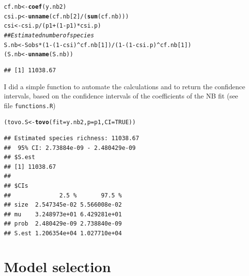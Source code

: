 \documentclass[12pt, A4]{article}\usepackage[]{graphicx}\usepackage[]{color}
\makeatletter
\newcommand{\hlnum}[1]{\textcolor[rgb]{0.686,0.059,0.569}{#1}}%
\newcommand{\hlcom}[1]{\textcolor[rgb]{0.678,0.584,0.686}{\textit{#1}}}%
\newcommand{\hlopt}[1]{\textcolor[rgb]{0,0,0}{#1}}%
\newcommand{\hlstd}[1]{\textcolor[rgb]{0.345,0.345,0.345}{#1}}%
\newcommand{\hlkwb}[1]{\textcolor[rgb]{0.69,0.353,0.396}{#1}}%
\newcommand{\hlkwc}[1]{\textcolor[rgb]{0.333,0.667,0.333}{#1}}%
\newcommand{\hlkwd}[1]{\textcolor[rgb]{0.737,0.353,0.396}{\textbf{#1}}}%
\newenvironment{kframe}{%
 \def\at@end@of@kframe{}%
 \ifinner\ifhmode%
  \def\at@end@of@kframe{\end{minipage}}%
  \begin{minipage}{\columnwidth}%
 \fi\fi%
 \def\FrameCommand##1{\hskip\@totalleftmargin \hskip-\fboxsep
 \colorbox{shadecolor}{##1}\hskip-\fboxsep
     \hskip-\linewidth \hskip-\@totalleftmargin \hskip\columnwidth}%
 \MakeFramed {\advance\hsize-\width
   \@totalleftmargin\z@ \linewidth\hsize
   \@setminipage}}%
 {\par\unskip\endMakeFramed%
 \at@end@of@kframe}
\newenvironment{knitrout}{}{} %
\newcommand{\code}[1]{\texttt{#1}}
\makeatother
\begin{document}
 
\begin{knitrout}
\color{fgcolor}\begin{kframe}
\begin{alltt}
\hlstd{cf.nb} \hlkwb{<-} \hlkwd{coef}\hlstd{(y.nb2)}
\hlstd{csi.p} \hlkwb{<-} \hlkwd{unname}\hlstd{(cf.nb[}\hlnum{2}\hlstd{]}\hlopt{/}\hlstd{(}\hlkwd{sum}\hlstd{(cf.nb)))}
\hlstd{csi} \hlkwb{<-} \hlstd{csi.p}\hlopt{/}\hlstd{(p1}\hlopt{+}\hlstd{(}\hlnum{1}\hlopt{-}\hlstd{p1)}\hlopt{*}\hlstd{csi.p)}
\hlcom{## Estimated number of species }
\hlstd{S.nb} \hlkwb{<-} \hlstd{Sobs}\hlopt{*}\hlstd{(}\hlnum{1}\hlopt{-}\hlstd{(}\hlnum{1}\hlopt{-}\hlstd{csi)}\hlopt{^}\hlstd{cf.nb[}\hlnum{1}\hlstd{])} \hlopt{/} \hlstd{(}\hlnum{1}\hlopt{-}\hlstd{(}\hlnum{1}\hlopt{-}\hlstd{csi.p)}\hlopt{^}\hlstd{cf.nb[}\hlnum{1}\hlstd{])}
\hlstd{(S.nb} \hlkwb{<-} \hlkwd{unname}\hlstd{(S.nb))}
\end{alltt}
\begin{verbatim}
## [1] 11038.67
\end{verbatim}
\end{kframe}
\end{knitrout}

I did a simple function to automate the calculations and to return
the confidence intervals, based on the confidence intervals of the 
coefficients of the NB fit (see file \code{functions.R})

 
\begin{knitrout}
\color{fgcolor}\begin{kframe}
\begin{alltt}
\hlstd{(tovo.S} \hlkwb{<-} \hlkwd{tovo}\hlstd{(}\hlkwc{fit} \hlstd{= y.nb2,} \hlkwc{p} \hlstd{= p1,} \hlkwc{CI}\hlstd{=}\hlnum{TRUE}\hlstd{))}
\end{alltt}
\begin{verbatim}
## Estimated species richness: 11038.67 
##  95% CI: 2.73884e-09 - 2.480429e-09
## $S.est
## [1] 11038.67
## 
## $CIs
##              2.5 %       97.5 %
## size  2.547345e-02 5.566008e-02
## mu    3.248973e+01 6.429281e+01
## prob  2.480429e-09 2.738840e-09
## S.est 1.206354e+04 1.027710e+04
\end{verbatim}
\end{kframe}
\end{knitrout}


\section{Model selection}
\end{document}
